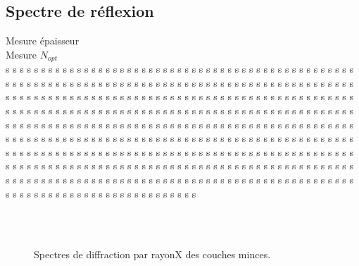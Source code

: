\documentclass[a4paper,12pt,oneside]{article}
\begin{document}
\subsection{Spectre de réflexion}

Mesure épaisseur \\
Mesure $N_{opt}$ \\
s s s s s s s s s s s s s s s s s s s s s s s s s s s s s s s s s s s s s s s s s s s s s s s s s s s s s s s s s s s s s s s s s s s s s s s s s s s s s s s s s s s s s s s s s s s s s s s s s s s s s s s s s s s s s s s s s s s s s s s s s s s s s s s s s s s s s s s s s s s s s s s s s s s s s s s s s s s s s s s s s s s s s s s s s s s s s s s s s s s s s s s s s s s s s s s s s s s s s s s s s s s s s s s s s s s s s s s s s s s s s s s s s s s s s s s s s s s s s s s s s s s s s s s s s s s s s s s s s s s s s s s s s s s s s s s s s s s s s s s s s s s s s s s s s s s s s s s s s s s s s s s s s s s s s s s s s s s s s s s s s s s s s s s s s s s s s s s s s s s s s s s s s s s s s s s s s s s s s s s s s s s s s s s s s s s s s s s s s s s s s s s s s s s s s s s s s s s s s s s s s s s s s s s s s s s s s s s s s s s s s s s s s s s s s s s s s s s s s s s s s s s s s s s s s s s s s s s s s s s s s s s s s s s s 


\begin{figure}[!ht]
	\\
	\hfill
	\hfill
	\\
	\begin{center}
	\end{center}
	\caption{Spectres de diffraction par rayonX des couches minces.}
	\label{fig:diff_main}
\end{figure}
\end{document}

